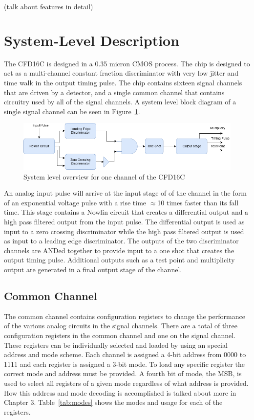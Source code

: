 \documentclass[12pt,oneside,final]{siuethesis}
\theoremstyle{definition}
\begin{document}
(talk about features in detail)

\section{System-Level Description}
\par The CFD16C is designed in a 0.35 micron CMOS process. The chip is designed to act as a multi-channel constant fraction discriminator with very low jitter and time walk in the output timing pulse. The chip contains sixteen signal channels that are driven by a detector, and a single common channel that contains circuitry used by all of the signal channels. A system level block diagram of a single signal channel can be seen in Figure~\ref{fig:CFD}.

\begin{figure}[ht]
\centering
\includegraphics[scale=.5,keepaspectratio=true]{./ch2_figures/CFD.png} 
\caption{System level overview for one channel of the CFD16C}
\label{fig:CFD}
\end{figure}

\par An analog input pulse will arrive at the input stage of of the channel in the form of an exponential voltage pulse with a rise time $\approx$10 times faster than its fall time. This stage contains a Nowlin circuit that creates a differential output and a high pass filtered output from the input pulse. The differential output is used as input to a zero crossing discriminator while the high pass filtered output is used as input to a leading edge discriminator. The outputs of the two discriminator channels are ANDed together to provide input to a one shot that creates the output timing pulse. Additional outputs such as a test point and multiplicity output are generated in a final output stage of the channel.

\subsection{Common Channel}
\par The common channel contains configuration registers to change the performance of the various analog circuits in the signal channels. There are a total of three configuration registers in the common channel and one on the signal channel. These registers can be individually selected and loaded by using an special address and mode scheme. Each channel is assigned a 4-bit address from 0000 to 1111 and each register is assigned a 3-bit mode. To load any specific register the correct mode and address must be provided. A fourth bit of mode, the MSB, is used to select all registers of a given mode regardless of what address is provided. How this address and mode decoding is accomplished is talked about more in Chapter 3. Table~\ref{tab:modes} shows the modes and usage for each of the registers.
\end{document}

